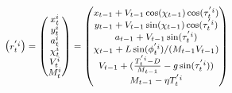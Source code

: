 \begin{equation}
\footnotesize
\begin{aligned}
  \begin{pmatrix}
    r^{'i}_{t}    \\ 
  \end{pmatrix}
  =
  \begin{pmatrix}
    x^i_{t}    \\ 
    y^i_{t}    \\ 
    a^i_{t}    \\ 
    \chi^i_{t} \\ 
    V^i_{t}    \\ 
    M^i_{t}    \\ 
  \end{pmatrix}
  =
  \begin{pmatrix}
    x_{t-1}   + V_{t-1} \cos(\chi_{t-1}) \cos(\tau^{'i}_{t}) \\
    y_{t-1}   + V_{t-1} \sin(\chi_{t-1}) \cos(\tau^{'i}_{t}) \\ 
    a_{t-1}   + V_{t-1} \sin(\tau^{'i}_{t}) \\
    \chi_{t-1} + L \sin(\phi^{'i}_{t})/(M_{t-1} V_{t-1}) \\
    V_{t-1}   + (\frac{T^{'i}_{t}-D}{M_{t-1}} - g \sin(\tau^{'i}_{t})) \\
    M_{t-1}   - \eta T^{'i}_{t}  \\
  \end{pmatrix}
\end{aligned}
\label{eq:atm_s}
\end{equation}




